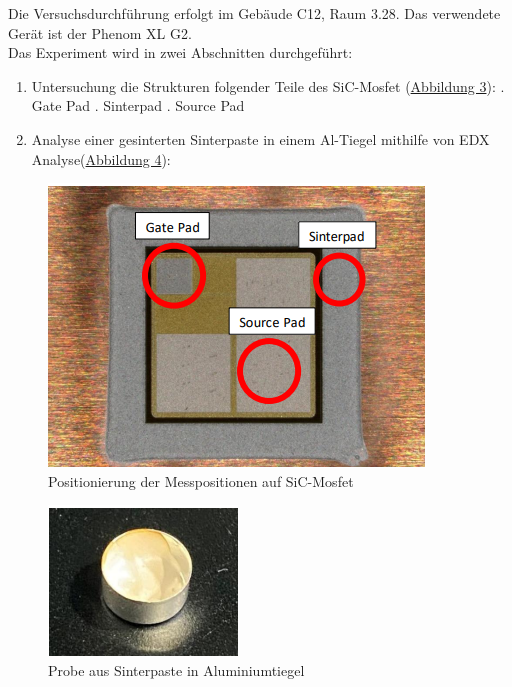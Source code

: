 Die Versuchsdurchführung erfolgt im Gebäude C12, Raum 3.28. Das verwendete Gerät ist der Phenom XL G2.\\
Das Experiment wird in zwei Abschnitten durchgeführt:\\
\begin{enumerate}
\item Untersuchung die Strukturen folgender Teile des SiC-Mosfet (\hyperref[Abb.3: Positionierung der Messpositionen auf SiC-Mosfet]{Abbildung 3}):
    . Gate Pad
    . Sinterpad
    . Source Pad
\item Analyse einer gesinterten Sinterpaste in einem Al-Tiegel mithilfe von EDX Analyse(\hyperref[Abb.4: Probe aus Sinterpaste in Aluminiumtiegel]{Abbildung 4}):
\end{enumerate}
\vspace{0.5cm}
\begin{figure}[H]
    \centering
    \includegraphics[scale=0.95]{Bilder/Screenshot 2025-04-10 185117}
    \caption{Positionierung der Messpositionen auf SiC-Mosfet\cite{key}}
    \vspace{0.2cm}
    \label{Abb.3: Positionierung der Messpositionen auf SiC-Mosfet}
\end{figure} 
\begin{figure}[H]
    \centering
    \includegraphics[scale=0.95]{Bilder/Screenshot 2025-04-10 190248}
    \caption{Probe aus Sinterpaste in Aluminiumtiegel\cite{key}}
    
    \vspace{0.2cm}
    \label{Abb.4: Probe aus Sinterpaste in Aluminiumtiegel}
\end{figure} 
